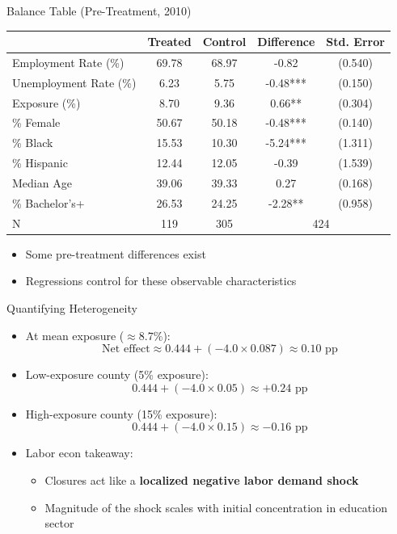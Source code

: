 \documentclass[aspectratio=169]{beamer}
\begin{document}
\begin{frame}{Balance Table (Pre-Treatment, 2010)}
  \begin{table}
  \tiny
  \centering
  \begin{tabular}{lcccc}
  \toprule
   & Treated & Control & Difference & Std. Error \\
  \midrule
  Employment Rate (\%) & 69.78 & 68.97 & -0.82 & (0.540) \\
  Unemployment Rate (\%) & 6.23 & 5.75 & -0.48*** & (0.150) \\
  Exposure (\%) & 8.70 & 9.36 & 0.66** & (0.304) \\
  \% Female & 50.67 & 50.18 & -0.48*** & (0.140) \\
  \% Black & 15.53 & 10.30 & -5.24*** & (1.311) \\
  \% Hispanic & 12.44 & 12.05 & -0.39 & (1.539) \\
  Median Age & 39.06 & 39.33 & 0.27 & (0.168) \\
  \% Bachelor's+ & 26.53 & 24.25 & -2.28** & (0.958) \\
  \midrule
  N & 119 & 305 & \multicolumn{2}{c}{424} \\
  \bottomrule
  \end{tabular}
  \end{table}
  \vspace{0.2cm}
  \begin{itemize}
    \item Some pre-treatment differences exist
    \item Regressions control for these observable characteristics
  \end{itemize}
\end{frame}

\begin{frame}{Quantifying Heterogeneity}
  \begin{itemize}
    \item At mean exposure ($\approx 8.7\%$):
      \[
        \text{Net effect} \approx 0.444 + (-4.0 \times 0.087) \approx 0.10 \text{ pp}
      \]
    \item Low-exposure county (5\% exposure):
      \[
        0.444 + (-4.0 \times 0.05) \approx +0.24 \text{ pp}
      \]
    \item High-exposure county (15\% exposure):
      \[
        0.444 + (-4.0 \times 0.15) \approx -0.16 \text{ pp}
      \]
    \item Labor econ takeaway:
      \begin{itemize}
        \item Closures act like a \textbf{localized negative labor demand shock}
        \item Magnitude of the shock scales with initial concentration in education sector
      \end{itemize}
  \end{itemize}
\end{frame}
\end{document}

